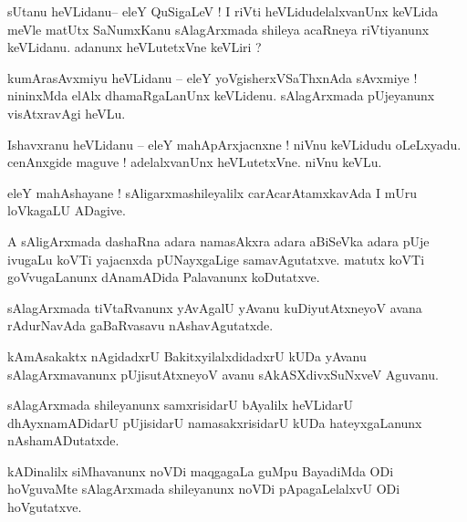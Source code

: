 \documentclass{article}
\begin{document}

\begin{mn}%
sUtanu heVLidanu-- eleY QuSigaLeV ! I riVti heVLidudelalxvanUnx keVLida meVle matUtx SaNumxKanu 
sAlagArxmada shileya acaRneya riVtiyanunx keVLidanu. adanunx heVLutetxVne keVLiri ?
\end{mn}

\begin{mn}%
kumArasAvxmiyu heVLidanu -- eleY yoVgisherxVSaThxnAda sAvxmiye ! nininxMda elAlx dhamaRgaLanUnx 
keVLidenu. sAlagArxmada pUjeyanunx visAtxravAgi heVLu.
\end{mn}

\begin{mn}%
Ishavxranu heVLidanu -- eleY mahApArxjacnxne ! niVnu keVLidudu oLeLxyadu. cenAnxgide maguve ! 
adelalxvanUnx heVLutetxVne. niVnu keVLu.
\end{mn}

\begin{mn}%
eleY mahAshayane ! sAligarxmashileyalilx carAcarAtamxkavAda I mUru loVkagaLU ADagive.
\end{mn}

\begin{mn}%
A sAligArxmada dashaRna adara namasAkxra adara aBiSeVka adara pUje ivugaLu koVTi yajacnxda 
pUNayxgaLige samavAgutatxve. matutx koVTi goVvugaLanunx dAnamADida Palavanunx koDutatxve.
\end{mn}

\begin{mn}%
sAlagArxmada tiVtaRvanunx yAvAgalU yAvanu kuDiyutAtxneyoV avana rAdurNavAda gaBaRvasavu 
nAshavAgutatxde.
\end{mn}

\begin{mn}%
kAmAsakaktx nAgidadxrU BakitxyilalxdidadxrU kUDa yAvanu sAlagArxmavanunx pUjisutAtxneyoV avanu 
sAkASXdivxSuNxveV Aguvanu.
\end{mn}

\begin{mn}%
sAlagArxmada shileyanunx samxrisidarU bAyalilx heVLidarU dhAyxnamADidarU pUjisidarU 
namasakxrisidarU kUDa hateyxgaLanunx nAshamADutatxde.
\end{mn}

\begin{mn}%
kADinalilx siMhavanunx noVDi maqgagaLa guMpu BayadiMda ODi hoVguvaMte sAlagArxmada shileyanunx 
noVDi pApagaLelalxvU ODi hoVgutatxve.
\end{mn}
\end{document}
